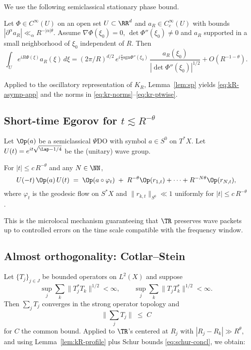 We use the following semiclassical stationary phase bound.

\begin{lemma}\label{lem:sp}
Let $\Phi\in C^\infty(U)$ on an open set $U\subset\RR^d$ and $a_R\in C_c^\infty(U)$
with bounds $|\partial^\alpha a_R|\ll_{\alpha} R^{-|\alpha|\theta}$.
Assume $\nabla\Phi(\xi_0)=0$, $\det \Phi''(\xi_0)\neq 0$ and $a_R$ supported
in a small neighborhood of $\xi_0$ independent of $R$. Then
\[
\int_U e^{iR\Phi(\xi)}a_R(\xi)\,d\xi
= (2\pi/R)^{d/2}\,e^{i\frac{\pi}{4}\mathrm{sgn}\Phi''(\xi_0)}\,
\frac{a_R(\xi_0)}{|\det\Phi''(\xi_0)|^{1/2}} + O(R^{-1-\theta}).
\]
\end{lemma}

Applied to the oscillatory representation of $K_R$,
Lemma~\ref{lem:sp} yields \eqref{eq:kR-asymp-app} and the norms in
\eqref{eq:kr-norms}--\eqref{eq:kr-ptwise}.

\subsection{Short-time Egorov for $t\lesssim R^{-\theta}$}
\label{app:aux:egorov}

Let $\Op(a)$ be a semiclassical $\Psi$DO with symbol $a\in S^0$ on $T^*X$.
Let $U(t)=e^{it\sqrt{\Lap-1/4}}$ be the (unitary) wave group.

\begin{lemma}\label{lem:egorov}
For $|t|\le c\,R^{-\theta}$ and any $N\in\NN$,
\[
U(-t)\,\Op(a)\,U(t) \;=\; \Op(a\circ \varphi_t)
\;+\; R^{-\theta}\Op(r_{1,t})+\cdots+R^{-N\theta}\Op(r_{N,t}),
\]
where $\varphi_t$ is the geodesic flow on $S^*X$ and
$\|r_{k,t}\|_{S^0}\ll 1$ uniformly for $|t|\le c\,R^{-\theta}$.
\end{lemma}

This is the microlocal mechanism guaranteeing that $\TR$ preserves
wave packets up to controlled errors on the time scale compatible with
the frequency window.

\subsection{Almost orthogonality: Cotlar--Stein}
\label{app:aux:cotlar}

Let $\{T_j\}_{j\in J}$ be bounded operators on $L^2(X)$ and suppose
\[
\sup_{j}\sum_{k}\|T_j^*T_k\|^{1/2} <\infty, \qquad
\sup_{j}\sum_{k}\|T_jT_k^*\|^{1/2} <\infty.
\]
Then $\sum_j T_j$ converges in the strong operator topology and
\[
\Big\|\sum_j T_j\Big\| \;\le\; C
\]
for $C$ the common bound. Applied to $\TR$’s centered at $R_j$
with $|R_j-R_k|\gg R^\theta$, and using Lemma~\ref{lem:kR-profile}
plus Schur bounds \eqref{eq:schur-concl}, we obtain:

